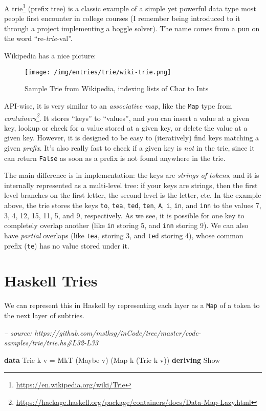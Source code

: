 \documentclass[]{article}
\newenvironment{Shaded}{}{}
\newcommand{\CommentTok}[1]{\textcolor[rgb]{0.38,0.63,0.69}{\textit{#1}}}
\newcommand{\DataTypeTok}[1]{\textcolor[rgb]{0.56,0.13,0.00}{#1}}
\newcommand{\FunctionTok}[1]{\textcolor[rgb]{0.02,0.16,0.49}{#1}}
\newcommand{\KeywordTok}[1]{\textcolor[rgb]{0.00,0.44,0.13}{\textbf{#1}}}
\newcommand{\NormalTok}[1]{#1}
\renewcommand{\href}[2]{#2\footnote{\url{#1}}}
\begin{document}
A \href{https://en.wikipedia.org/wiki/Trie}{trie} (prefix tree) is a classic
example of a simple yet powerful data type most people first encounter in
college courses (I remember being introduced to it through a project
implementing a boggle solver). The name comes from a pun on the word
``re-\emph{trie}-val''.

Wikipedia has a nice picture:

\begin{figure}
\centering
\texttt{[image: /img/entries/trie/wiki-trie.png]}
\caption{Sample Trie from Wikipedia, indexing lists of Char to Ints}
\end{figure}

API-wise, it is very similar to an \emph{associative map}, like the \texttt{Map}
type from
\emph{\href{https://hackage.haskell.org/package/containers/docs/Data-Map-Lazy.html}{containers}}.
It stores ``keys'' to ``values'', and you can insert a value at a given key,
lookup or check for a value stored at a given key, or delete the value at a
given key. However, it is designed to be easy to (iteratively) find keys
matching a given \emph{prefix}. It's also really fast to check if a given key is
\emph{not} in the trie, since it can return \texttt{False} as soon as a prefix
is not found anywhere in the trie.

The main difference is in implementation: the keys are \emph{strings of tokens},
and it is internally represented as a multi-level tree: if your keys are
strings, then the first level branches on the first letter, the second level is
the letter, etc. In the example above, the trie stores the keys \texttt{to},
\texttt{tea}, \texttt{ted}, \texttt{ten}, \texttt{A}, \texttt{i}, \texttt{in},
and \texttt{inn} to the values 7, 3, 4, 12, 15, 11, 5, and 9, respectively. As
we see, it is possible for one key to completely overlap another (like
\texttt{in} storing 5, and \texttt{inn} storing 9). We can also have
\emph{partial} overlaps (like \texttt{tea}, storing 3, and \texttt{ted} storing
4), whose common prefix (\texttt{te}) has no value stored under it.

\hypertarget{haskell-tries}{%
\section{Haskell Tries}\label{haskell-tries}}

We can represent this in Haskell by representing each layer as a \texttt{Map} of
a token to the next layer of subtries.

\begin{Shaded}
\begin{Highlighting}[]
\CommentTok{-- source: https://github.com/mstksg/inCode/tree/master/code-samples/trie/trie.hs#L32-L33}

\KeywordTok{data} \DataTypeTok{Trie}\NormalTok{  k v   }\FunctionTok{=} \DataTypeTok{MkT}\NormalTok{  (}\DataTypeTok{Maybe}\NormalTok{ v) (}\DataTypeTok{Map}\NormalTok{ k (}\DataTypeTok{Trie}\NormalTok{ k v))}
  \KeywordTok{deriving} \DataTypeTok{Show}
\end{Highlighting}
\end{Shaded}
\end{document}
